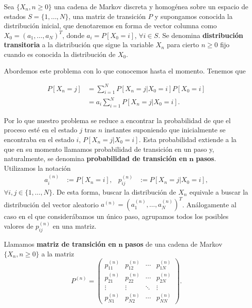 Sea $\{X_n, n\geq 0\}$ una cadena de Markov discreta y homogénea sobre un espacio de estados $S=\{1,\dots,N\}$, una matriz de transición $P$ y supongamos conocida la distribución inicial, que denotaremos en forma de vector columna como $X_0 = (a_1, \dots, a_N)^T$, donde $a_i = P[X_0 = i]$, $\forall i \in S$. Se denomina \textbf{distribución transitoria} a la distribución que sigue la variable $X_n$ para cierto $n\geq 0$ fijo cuando es conocida la distribución de $X_0$.

Abordemos este problema con lo que conocemos hasta el momento. Tenemos que

\begin{equation}
    \begin{split}
        P[X_n = j] &= \sum_{i=1}^N P[X_n=j|X_0 = i]P[X_0=i] \\
        &= a_i \sum_{i=1}^N P[X_n=j|X_0 = i].
    \end{split}
\end{equation}

Por lo que nuestro problema se reduce a encontrar la probabilidad de que el proceso esté en el estado $j$ tras $n$ instantes suponiendo que inicialmente se encontraba en el estado $i$, $P[X_n=j|X_0 = i]$. Esta probabilidad extiende a la que en su momento llamamos probabilidad de transición en un paso y, naturalmente, se denomina \textbf{probabilidad de transición en }$\mathbf{n}$ \textbf{pasos}. Utilizamos la notación  
\begin{align*}
    a_i^{(n)} &:= P[X_n=i], & p_{ij}^{(n)} &:= P[X_{n}=j|X_0=i],
\end{align*}
$\forall i,j \in \{1,\dots,N\}$. De esta forma, buscar la distribución de $X_n$ equivale a buscar la distribución del vector aleatorio $a^{(n)}=(a_1^{(n)},\dots,a_N^{(n)})^T$. Análogamente al caso en el que considerábamos un único paso, agrupamos todos los posibles valores de $p_{ij}^{(n)}$ en una matriz.

\begin{definicion}
    Llamamos \textbf{matriz de transición en }$\mathbf{n}$ \textbf{pasos} de una cadena de Markov $\{X_n, n\geq 0\}$ a la matriz
    \begin{equation}
        \label{eq:matriz-trans-n}
        P^{(n)}=\begin{pmatrix}
          p_{11}^{(n)} & p_{12}^{(n)} & \cdots & p_{1N}^{(n)} \\
          p_{21}^{(n)} & p_{22}^{(n)} & \cdots & p_{2N}^{(n)} \\
          \vdots & \vdots & \ddots & \vdots \\
          p_{N1}^{(n)} & p_{N2}^{(n)} & \cdots & p_{NN}^{(n)}  
        \end{pmatrix}.
    \end{equation}
\end{definicion}

